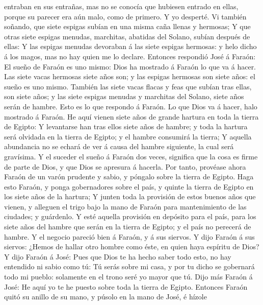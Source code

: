 entraban en sus entrañas, mas no se conocía que hubiesen entrado en
ellas, porque su parecer era aún malo, como de primero. Y yo desperté.
 Vi también soñando, que siete espigas subían en una misma
caña llenas y hermosas;  Y que otras siete espigas menudas,
marchitas, abatidas del Solano, subían después de ellas:  Y
las espigas menudas devoraban á las siete espigas hermosas: y helo dicho
á los magos, mas no hay quien me lo declare.  Entonces
respondió José á Faraón: El sueño de Faraón es uno mismo: Dios ha
mostrado á Faraón lo que va á hacer.  Las siete vacas
hermosas siete años son; y las espigas hermosas son siete años: el sueño
es uno mismo.  También las siete vacas flacas y feas que
subían tras ellas, son siete años; y las siete espigas menudas y
marchitas del Solano, siete años serán de hambre.  Esto es
lo que respondo á Faraón. Lo que Dios va á hacer, halo mostrado á
Faraón.  He aquí vienen siete años de grande hartura en
toda la tierra de Egipto:  Y levantarse han tras ellos
siete años de hambre; y toda la hartura será olvidada en la tierra de
Egipto; y el hambre consumirá la tierra;  Y aquella
abundancia no se echará de ver á causa del hambre siguiente, la cual
será gravísima.  Y el suceder el sueño á Faraón dos veces,
significa que la cosa es firme de parte de Dios, y que Dios se apresura
á hacerla.  Por tanto, provéase ahora Faraón de un varón
prudente y sabio, y póngalo sobre la tierra de Egipto. 
Haga esto Faraón, y ponga gobernadores sobre el país, y quinte la tierra
de Egipto en los siete años de la hartura;  Y junten toda
la provisión de estos buenos años que vienen, y alleguen el trigo bajo
la mano de Faraón para mantenimiento de las ciudades; y guárdenlo.
 Y esté aquella provisión en depósito para el país, para
los siete años del hambre que serán en la tierra de Egipto; y el país no
perecerá de hambre.  Y el negocio pareció bien á Faraón, y
á sus siervos.  Y dijo Faraón á sus siervos: ¿Hemos de
hallar otro hombre como éste, en quien haya espíritu de Dios?
 Y dijo Faraón á José: Pues que Dios te ha hecho saber todo
esto, no hay entendido ni sabio como tú:  Tú serás sobre mi
casa, y por tu dicho se gobernará todo mi pueblo: solamente en el trono
seré yo mayor que tú.  Dijo más Faraón á José: He aquí yo
te he puesto sobre toda la tierra de Egipto.  Entonces
Faraón quitó su anillo de su mano, y púsolo en la mano de José, é hízole

